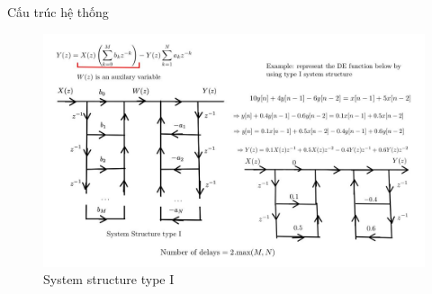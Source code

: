 \documentclass[8pt]{beamer}
\begin{document}
\begin{frame}{Cấu trúc hệ thống}
\begin{figure}[h]
			\includegraphics[width=1.1\textwidth]{4.jpg}
			\caption{System structure type I}			\label{fig:re4}

		\end{figure}

\end{frame}
\end{document}
